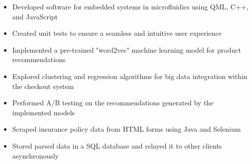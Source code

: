\documentclass[10pt,a4paper,ragged2e]{altacv}
\begin{document}

\begin{fullwidth}\makecvheader
\end{fullwidth}


\begin{itemize}
\item Developed software for embedded systems in microfluidics using QML, C++, and JavaScript
\item Created unit tests to ensure a seamless and intuitive user experience
\end{itemize}

\divider

\begin{itemize}
\item Implemented a pre-trained "word2vec" machine learning model for product recommendations
\item Explored clustering and regression algorithms for big data integration within the checkout system
\item Performed A/B testing on the recommendations generated by the implemented models
\end{itemize}

\divider

\begin{itemize}
\item Scraped insurance policy data from HTML forms using Java and Selenium
\item Stored parsed data in a SQL database and relayed it to other clients asynchronously
\end{itemize}

\end{document}
